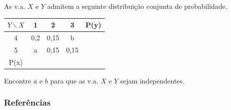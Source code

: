\documentclass[14pt,aspectratio=1610]{beamer}
\begin{document}
\begin{frame}{}
\frametitle{}
\begin{block}{}
\justifying
As v.a. $X$ e $Y$ admitem a seguinte distribuição conjunta de probabilidade.
\begin{center}
\begin{tabular}{c|ccc|c}
    $Y\backslash  X$ & 1 & 2 & 3 & P(y) \\
  \hline
  4    & 0,2 & 0,15 & b    &   \\
  5    & a   & 0,15 & 0,15 &   \\
  \hline
  P(x) &     &      &      &   \\
   \end{tabular}
\end{center}

Encontre $a$ e $b$ para que as v.a. $X$ e $Y$ sejam independentes.
\end{block}
\nocite{Morettin09, Apostila, eric, montgomery2016, meyer1982probabilidade, Bastos2025}
\end{frame}

\begin{frame}[allowframebreaks]
\frametitle{\bf Referências}
\printbibliography
\end{frame}
\end{document}
